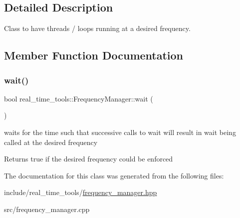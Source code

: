 \subsection{Detailed Description}
Class to have threads / loops running at a desired frequency. 

\subsection{Member Function Documentation}
\mbox{\label{classreal__time__tools_1_1FrequencyManager_a3496f77c75f5ac8013b9f62345595e80}} 
\subsubsection{\texorpdfstring{wait()}{wait()}}
{\footnotesize\ttfamily bool real\+\_\+time\+\_\+tools\+::\+Frequency\+Manager\+::wait (\begin{DoxyParamCaption}{ }\end{DoxyParamCaption})}



waits for the time such that successive calls to wait will result in wait being called at the desired frequency 

\begin{DoxyReturn}{Returns}
true if the desired frequency could be enforced 
\end{DoxyReturn}


The documentation for this class was generated from the following files\+:\begin{DoxyCompactItemize}
\item 
include/real\+\_\+time\+\_\+tools/\hyperlink{frequency__manager_8hpp}{frequency\+\_\+manager.\+hpp}\item 
src/frequency\+\_\+manager.\+cpp\end{DoxyCompactItemize}
